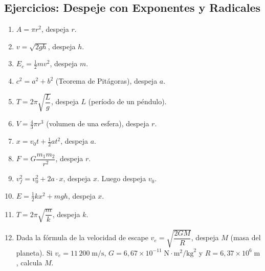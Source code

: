 \documentclass[12pt, letterpaper]{article}
\begin{document}
\newpage

\subsection{Ejercicios: Despeje con Exponentes y Radicales}

\begin{enumerate}[leftmargin=*, resume]
  \item \facil{} $A = \pi r^2$, despeja $r$.

  \item \facil{} $v = \sqrt{2gh}$, despeja $h$.

  \item \facil{} $E_c = \frac{1}{2}mv^2$, despeja $m$.

  \item \facil{} $c^2 = a^2 + b^2$ (Teorema de Pitágoras), despeja $a$.

  \item \medio{} $T = 2\pi\sqrt{\dfrac{L}{g}}$, despeja $L$ (período de un péndulo).

  \item \medio{} $V = \frac{4}{3}\pi r^3$ (volumen de una esfera), despeja $r$.

  \item \medio{} $x = v_0 t + \frac{1}{2}at^2$, despeja $a$.

  \item \medio{} $F = G\dfrac{m_1 m_2}{r^2}$, despeja $r$.

  \item \dificil{} $v_f^2 = v_0^2 + 2a \cdot x$, despeja $x$. Luego despeja $v_0$.

  \item \dificil{} $E = \frac{1}{2}kx^2 + mgh$, despeja $x$.

  \item \dificil{} $T = 2\pi\sqrt{\dfrac{m}{k}}$, despeja $k$.

  \item \dificil{} Dada la fórmula de la velocidad de escape $v_e = \sqrt{\dfrac{2GM}{R}}$, despeja $M$ (masa del planeta). Si $v_e = 11\,200\;\text{m/s}$, $G = 6{,}67 \times 10^{-11}\;\text{N}\cdot\text{m}^2/\text{kg}^2$ y $R = 6{,}37 \times 10^6\;\text{m}$, calcula $M$.
\end{enumerate}

\newpage

\end{document}
